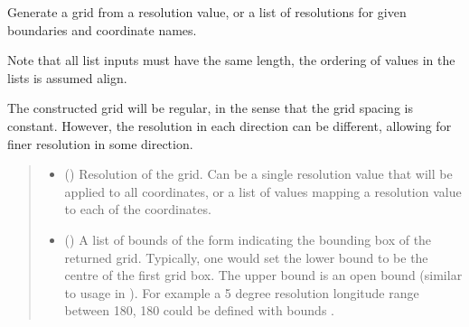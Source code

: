 \documentclass[letterpaper,10pt,english]{sphinxmanual}
\begin{document}
\begin{fulllineitems}
\label{\detokenize{covariance:glomar_gridding.grid.grid_from_resolution}}
\pysigstartsignatures
\pysiglinewithargsret
{}
{\sphinxparamcomma {}\sphinxparamcomma {}}
{}
\pysigstopsignatures
\sphinxAtStartPar
Generate a grid from a resolution value, or a list of resolutions for
given boundaries and coordinate names.

\sphinxAtStartPar
Note that all list inputs must have the same length, the ordering of values
in the lists is assumed align.

\sphinxAtStartPar
The constructed grid will be regular, in the sense that the grid spacing is
constant. However, the resolution in each direction can be different,
allowing for finer resolution in some direction.
\begin{quote}\begin{description}
\begin{itemize}
\item {}
\sphinxAtStartPar
{} (\sphinxstyleliteralemphasis{\sphinxupquote{ | }}\sphinxstyleliteralemphasis{\sphinxupquote{{[}}}\sphinxstyleliteralemphasis{\sphinxupquote{{]}}}) \textendash{} Resolution of the grid. Can be a single resolution value that will be
applied to all coordinates, or a list of values mapping a resolution
value to each of the coordinates.

\item {}
\sphinxAtStartPar
{} (\sphinxstyleliteralemphasis{\sphinxupquote{{[}}}\sphinxstyleliteralemphasis{\sphinxupquote{{[}}}\sphinxstyleliteralemphasis{\sphinxupquote{, }}\sphinxstyleliteralemphasis{\sphinxupquote{{]}}}\sphinxstyleliteralemphasis{\sphinxupquote{{]}}}) \textendash{} A list of bounds of the form  indicating
the bounding box of the returned grid. Typically, one would set the
lower bound to be the centre of the first grid box. The upper bound is
an open bound (similar to usage in ). For example a 5 degree
resolution longitude range between \sphinxhyphen{}180, 180 could be defined with
bounds .


\end{itemize}
\end{description}
\end{quote}
\end{fulllineitems}
\end{document}
